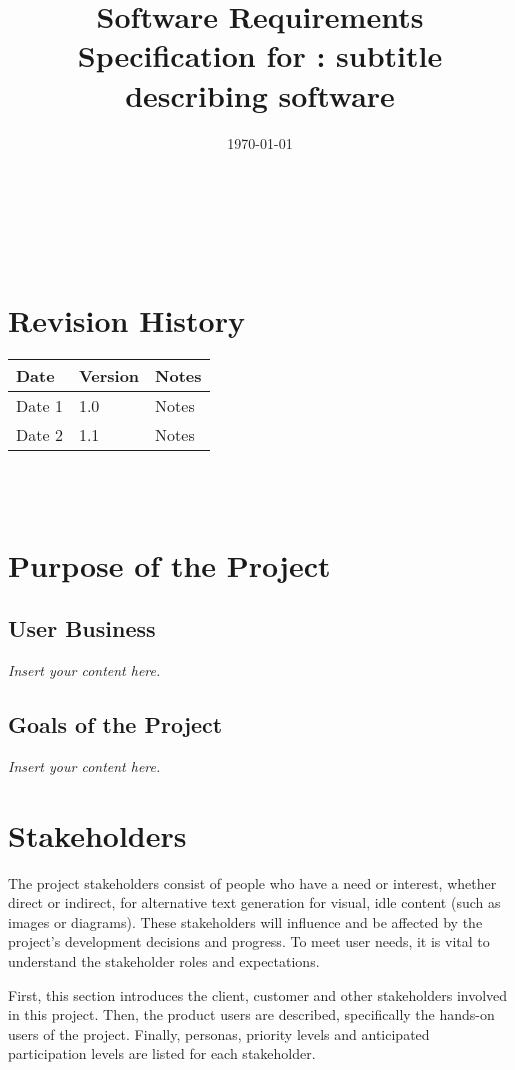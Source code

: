 \documentclass[12pt]{article}
\newcommand{\lips}{\textit{Insert your content here.}}
\begin{document}
\title{Software Requirements Specification for \progname: subtitle
describing software}
\author{\authname}
\date{\today}

\maketitle

~\newpage


\tableofcontents

~\newpage

\section*{Revision History}

\begin{tabularx}{\textwidth}{p{3cm}p{2cm}X}
  \toprule {\textbf{Date}} & {\textbf{Version}} & {\textbf{Notes}}\\
  \midrule
  Date 1 & 1.0 & Notes\\
  Date 2 & 1.1 & Notes\\
  \bottomrule
\end{tabularx}

~\\

~\newpage
\section{Purpose of the Project}
\subsection{User Business}
\lips
\subsection{Goals of the Project}
\lips
\section{Stakeholders}
The project stakeholders consist of people who have a need or
interest, whether direct or indirect, for alternative text generation
for visual, idle
content (such as images or diagrams). These stakeholders will
influence and be affected by the
project's development decisions and progress. To meet user
needs, it is vital to understand the stakeholder roles and expectations.
\par First, this section introduces the client, customer and other
stakeholders involved in this project. Then, the product users are
described, specifically the hands-on users of the project. Finally,
personas, priority levels and anticipated
participation levels are listed for each stakeholder.
\end{document}

